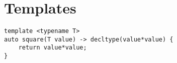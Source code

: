 \section{Templates}
\begin{lstlisting}
template <typename T>
auto square(T value) -> decltype(value*value) {
	return value*value;
}
\end{lstlisting}
